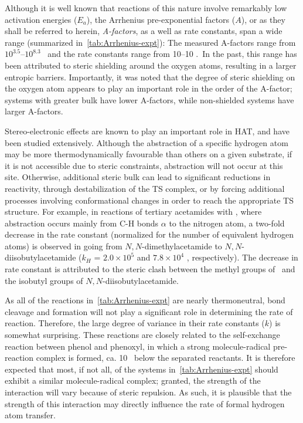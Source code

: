 Although it is well known that reactions of this nature involve remarkably low
activation energies ($E_a$),\cite{Lucarini1996, Mahoney1970a, Mahoney1975,
Korcek1972} the Arrhenius pre-exponential factors ($A$), or as they shall be
referred to herein, \emph{A-factors}, as a well as rate constants, span a wide
range (summarized in~\ref{tab:Arrhenius-expt}): The measured A-factors range
from $10^{3.5}$--$10^{8.3}$ \Ms\ and the rate constants range from 10--10
\Ms.\ In the past, this range has been attributed to steric shielding around
the oxygen atoms, resulting in a larger entropic barriers.\cite{DiLabio2005}
Importantly, it was noted that the degree of steric shielding on the oxygen
atom appears to play an important role in the order of the A-factor; systems
with greater bulk have lower A-factors, while non-shielded systems have larger
A-factors.

Stereo-electronic effects are known to play an important role in HAT, and have
been studied extensively.\cite{Finn2004, Salamone2011, Pischel2001,
Griller1981, Bietti2011, Salamone2012, Malatesta1982, Salamone2014} Although
the abstraction of a specific hydrogen atom may be more thermodynamically
favourable than others on a given substrate, if it is not accessible due to
steric constraints, abstraction will not occur at this site. Otherwise,
additional steric bulk can lead to significant reductions in reactivity,
through destabilization of the TS complex, or by forcing additional processes
involving conformational changes in order to reach the appropriate TS
structure. For example, in reactions of tertiary acetamides with
\cumo,\cite{Salamone2014} where abstraction occurs mainly from C-H bonds
$\alpha$ to the nitrogen atom, a two-fold decrease in the rate constant
(normalized for the number of equivalent hydrogen atoms) is observed in going
from $N,N$-dimethylacetamide to $N,N$-diisobutylacetamide ($k_H$ = $2.0 \times
10^5$ and $7.8 \times 10^4$ \Ms, respectively). The decrease in rate constant
is attributed to the steric clash between the methyl groups of \cumo\ and the
isobutyl groups of $N,N$-diisobutylacetamide.

As all of the reactions in~\ref{tab:Arrhenius-expt} are nearly thermoneutral,
bond cleavage and formation will not play a significant role in determining the
rate of reaction. Therefore, the large degree of variance in their rate
constants ($k$) is somewhat surprising. These reactions are closely related to
the self-exchange reaction between phenol and phenoxyl,\cite{Mayer2002} in
which a strong molecule-radical pre-reaction complex is formed, ca. 10
\kcalmol\ below the separated reactants. It is therefore expected that most, if
not all, of the systems in~\ref{tab:Arrhenius-expt} should exhibit a similar
molecule-radical complex; granted, the strength of the interaction will vary
because of steric repulsion. As such, it is plausible that the strength of this
interaction may directly influence the rate of formal hydrogen atom transfer.

